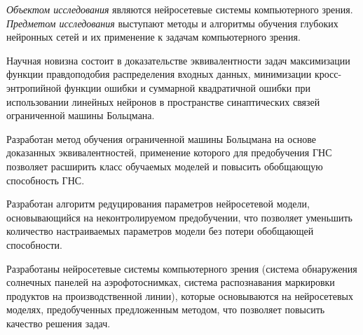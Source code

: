\textit{Объектом исследования} являются нейросетевые системы компьютерного зрения. \textit{Предметом исследования} выступают методы и алгоритмы обучения глубоких нейронных сетей и их применение к задачам компьютерного зрения.

\vspace{3mm}
\novelty
\vspace{3mm}

Научная новизна состоит в доказательстве эквивалентности задач максимизации функции правдоподобия распределения входных данных, минимизации кросс-энтропийной функции ошибки и суммарной квадратичной ошибки при использовании линейных нейронов в пространстве синаптических связей ограниченной машины Больцмана.

Разработан метод обучения ограниченной машины Больцмана на основе доказанных эквивалентностей, применение которого для предобучения ГНС позволяет расширить класс обучаемых моделей и повысить обобщающую способность ГНС.

Разработан алгоритм редуцирования параметров нейросетевой модели, основывающийся на неконтролируемом предобучении, что позволяет уменьшить количество настраиваемых параметров модели без потери обобщающей способности.

Разработаны нейросетевые системы компьютерного зрения (система обнаружения солнечных панелей на аэрофотоснимках, система распознавания маркировки продуктов на производственной линии), которые основываются на нейросетевых моделях, предобученных предложенным методом, что позволяет повысить качество решения задач.

\vspace{3mm}
\vspace{3mm}

